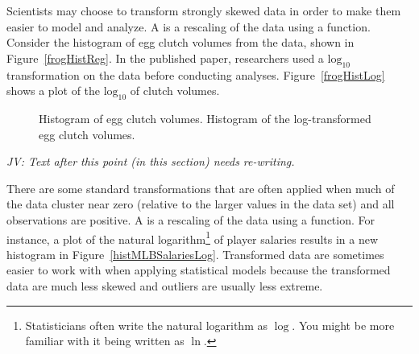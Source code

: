 \begin{doublespace}
Scientists may choose to transform strongly skewed data in order to make them easier to model and analyze. A  is a rescaling of the data using a function. Consider the histogram of egg clutch volumes from the  data, shown in Figure~\ref{frogHistReg}. In the published paper, researchers used a $\textrm {log}_{10}$ transformation on the data before conducting analyses. Figure~\ref{frogHistLog} shows a plot of the $\textrm {log}_{10}$ of clutch volumes.

\begin{figure}[ht]
\centering
{}
\caption{ Histogram of egg clutch volumes.  Histogram of the log-transformed egg clutch volumes.}
\label{frogHistTransform}
\end{figure}

\textit{JV: Text after this point (in this section) needs re-writing.}

There are some standard transformations that are often applied when much of the data cluster near zero (relative to the larger values in the data set) and all observations are positive. A  is a rescaling of the data using a function. For instance, a plot of the natural logarithm\footnote{Statisticians often write the natural logarithm as $\log$. You might be more familiar with it being written as $\ln$.} of player salaries results in a new histogram in Figure~\ref{histMLBSalariesLog}. Transformed data are sometimes easier to work with when applying statistical models because the transformed data are much less skewed and outliers are usually less extreme.


\end{doublespace}
